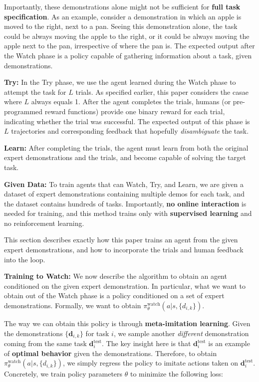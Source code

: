 \documentclass[
  letterpaper,
  numbers=noenddot,
  DIV=11]{scrreprt}
\theoremstyle{definition}
\theoremstyle{plain}
\theoremstyle{plain}
\theoremstyle{remark}
\begin{document}
Importantly, these demonstrations alone might not be sufficient for
\textbf{full task specification}. As an example, consider a
demonstration in which an apple is moved to the right, next to a pan.
Seeing this demonstration alone, the task could be always moving the
apple to the right, or it could be always moving the apple next to the
pan, irrespective of where the pan is. The expected output after the
Watch phase is a policy capable of gathering information about a task,
given demonstrations.

\textbf{Try:} In the Try phase, we use the agent learned during the
Watch phase to attempt the task for \(L\) trials. As specified earlier,
this paper considers the casae where \(L\) always equals 1. After the
agent completes the trials, humans (or pre-programmed reward functions)
provide one binary reward for each trial, indicating whether the trial
was successful. The expected output of this phase is \(L\) trajectories
and corresponding feedback that hopefully \emph{disambiguate} the task.

\textbf{Learn:} After completing the trials, the agent must learn from
both the original expert demonstrations and the trials, and become
capable of solving the target task.

\textbf{Given Data:} To train agents that can Watch, Try, and Learn, we
are given a dataset of expert demonstrations containing multiple demos
for each task, and the dataset contains hundreds of tasks. Importantly,
\textbf{no online interaction} is needed for training, and this method
trains only with \textbf{supervised learning} and no reinforcement
learning.

This section describes exactly how this paper trains an agent from the
given expert demonstrations, and how to incorporate the trials and human
feedback into the loop.

\textbf{Training to Watch:} We now describe the algorithm to obtain an
agent conditioned on the given expert demonstration. In particular, what
we want to obtain out of the Watch phase is a policy conditioned on a
set of expert demonstrations. Formally, we want to obtain
\(\pi_\theta^{\text{watch}}(a | s, \{d_{i,k}\})\).

The way we can obtain this policy is through \textbf{meta-imitation
learning}. Given the demonstrations \(\{\textbf{d}_{i,k}\}\) for task
\(i\), we sample another \emph{different} demonstration coming from the
same task \(\textbf{d}_i^{\text{test}}\). The key insight here is that
\(\textbf{d}_i^{\text{test}}\) is an example of \textbf{optimal
behavior} given the demonstrations. Therefore, to obtain
\(\pi_\theta^{\text{watch}}(a | s, \{d_{i,k}\})\), we simply regress the
policy to imitate actions taken on \(\textbf{d}_i^{\text{test}}\).
Concretely, we train policy parameters \(\theta\) to minimize the
following loss:
\end{document}
